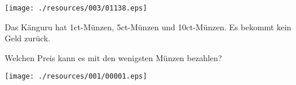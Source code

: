 \begin{center}
\texttt{[image: ./resources/003/01138.eps]}
\end{center}

Das Känguru hat 1ct-Münzen, 5ct-Münzen und 10ct-Münzen. Es bekommt kein Geld zurück.\par Welchen Preis kann es mit den wenigsten Münzen bezahlen?

\begin{center}
\texttt{[image: ./resources/001/00001.eps]}
\end{center}
